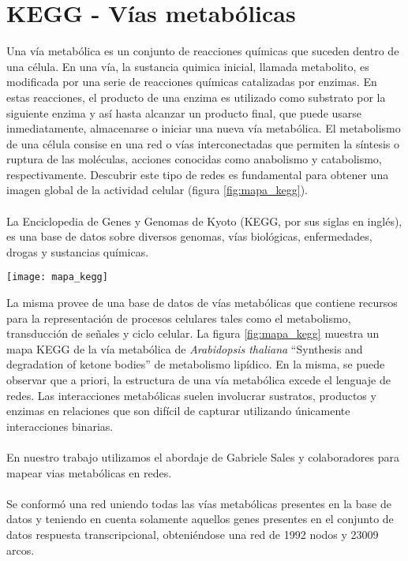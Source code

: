\section{KEGG - Vías metabólicas}
\label{sec:kegg}
Una vía metabólica es un conjunto de reacciones químicas que suceden dentro de una célula. En una vía, la sustancia quimica inicial, llamada metabolito, es modificada por una serie de reacciones químicas catalizadas por enzimas. En estas reacciones, el producto de una enzima es utilizado como substrato por la siguiente enzima y así hasta alcanzar un producto final, que puede usarse inmediatamente, almacenarse o iniciar una nueva vía metabólica. El metabolismo de una célula consise en una red o vías interconectadas que permiten la síntesis o ruptura de las moléculas, acciones conocidas como anabolismo y catabolismo, respectivamente. Descubrir este tipo de redes es fundamental para obtener una imagen global de la actividad celular (figura \ref{fig:mapa_kegg}).\\\\
La Enciclopedia de Genes y Genomas de Kyoto (KEGG, por sus siglas en inglés), es una base de datos sobre diversos genomas, vías biológicas, enfermedades, drogas y sustancias químicas.
\begin{center}
    \texttt{[image: mapa\_kegg]}
    \label{fig:mapa_kegg}
\end{center}
La misma provee de una base de datos de vías metabólicas que contiene recursos para la representación de procesos celulares tales como el metabolismo, transducción de señales y ciclo celular. La figura \ref{fig:mapa_kegg} muestra un mapa KEGG de la vía metabólica de \textit{Arabidopsis thaliana} ``Synthesis and degradation of ketone bodies'' de metabolismo lipídico. En la misma, se puede observar que a priori, la estructura de una vía metabólica excede el lenguaje de redes. Las interacciones metabólicas suelen involucrar sustratos, productos y enzimas en relaciones que son difícil de capturar utilizando únicamente interacciones binarias.\\\\
En nuestro trabajo utilizamos el abordaje de Gabriele Sales y colaboradores \cite{Graphite2015} para mapear vias metabólicas en redes.\\\\
Se conformó una red uniendo todas las vías metabólicas presentes en la base de datos y teniendo en cuenta solamente aquellos genes presentes en el conjunto de datos respuesta transcripcional, obteniéndose una red de 1992 nodos y 23009 arcos.
\cite{Segal2003, Kanehisa2000}
